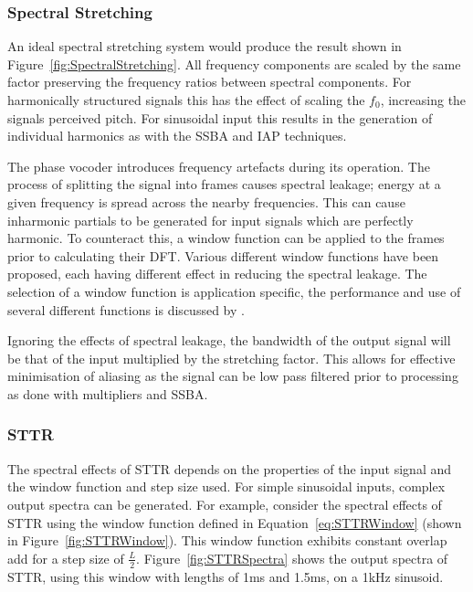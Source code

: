 		\subsubsection*{Spectral Stretching}
			An ideal spectral stretching system would produce the result shown in
			Figure~\ref{fig:SpectralStretching}. All frequency components are scaled by the same factor
			preserving the frequency ratios between spectral components. For harmonically structured signals
			this has the effect of scaling the $f_{0}$, increasing the signals perceived pitch. For sinusoidal
			input this results in the generation of individual harmonics as with the SSBA and IAP techniques.
			
			The phase vocoder introduces frequency artefacts during its operation. The process of splitting the
			signal into frames causes spectral leakage; energy at a given frequency is spread across the nearby
			frequencies. This can cause inharmonic partials to be generated for input signals which are
			perfectly harmonic. To counteract this, a window function can be applied to the frames prior to
			calculating their DFT. Various different window functions have been proposed, each having different
			effect in reducing the spectral leakage. The selection of a window function is application
			specific, the performance and use of several different functions is discussed by
			\citet{harris1978on}.
			
			Ignoring the effects of spectral leakage, the bandwidth of the output signal will be that of the
			input multiplied by the stretching factor. This allows for effective minimisation of aliasing as
			the signal can be low pass filtered prior to processing as done with multipliers and SSBA.
		
		\subsubsection*{STTR}
			The spectral effects of STTR depends on the properties of the input signal and the window function
			and step size used. For simple sinusoidal inputs, complex output spectra can be generated. For
			example, consider the spectral effects of STTR using the window function defined in
			Equation~\ref{eq:STTRWindow} (shown in Figure~\ref{fig:STTRWindow}). This window function exhibits
			constant overlap add for a step size of $\frac{L}{2}$. Figure~\ref{fig:STTRSpectra} shows the
			output spectra of STTR, using this window with lengths of 1ms and 1.5ms, on a 1kHz sinusoid.

